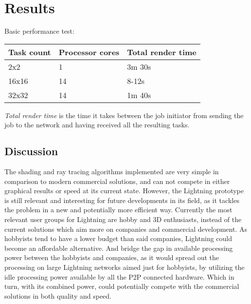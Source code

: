 \chapter{Results}

Basic performance test:
\begin{center}
    \begin{tabular}{ | l | l | l |} \hline
    Task count & Processor cores & Total render time \\ \hline
    2x2 & 1 & 3m 30s \\ \hline
    16x16 & 14 & 8-12s \\ \hline
    32x32 & 14 & 1m 40s \\ \hline
    \end{tabular}
    
    \emph{Total render time} is the time it takes between the job initiator from sending the job to the network and having received all the resulting tasks.
\end{center}

\section{Discussion}



The shading and ray tracing algorithms implemented are very simple in comparison to modern commercial solutions, and can not compete in either graphical results or speed at its current state. However, the Lightning prototype is still relevant and interesting for future developments in its field, as it tackles the problem in a new and potentially more efficient way. Currently the most relevant user groups for Lightning are hobby and 3D enthusiasts, instead of the current solutions which aim more on companies and commercial development. As hobbyists tend to have a lower budget than said companies, Lightning could become an affordable alternative. And bridge the gap in available processing power between the hobbyists and companies, as it would spread out the processing on large Lightning networks aimed just for hobbyists, by utilizing the idle processing power available by all the P2P connected hardware. Which in turn, with its combined power, could potentially compete with the commercial solutions in both quality and speed.

